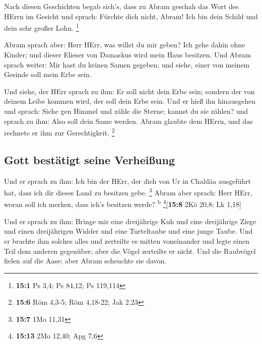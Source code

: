  Nach diesen Geschichten begab sich's, dass zu Abram
geschah das Wort des HErrn im Gesicht und sprach: Fürchte dich nicht,
Abram! Ich bin dein Schild und dein sehr großer Lohn. \footnote{\textbf{15:1}
  Ps 3,4; Ps 84,12; Ps 119,114}

 Abram sprach aber: Herr HErr, was willst du mir geben?
Ich gehe dahin ohne Kinder; und dieser Elieser von Damaskus wird mein
Haus besitzen.  Und Abram sprach weiter: Mir hast du
keinen Samen gegeben; und siehe, einer von meinem Gesinde soll mein Erbe
sein.

 Und siehe, der HErr sprach zu ihm: Er soll nicht dein
Erbe sein; sondern der von deinem Leibe kommen wird, der soll dein Erbe
sein.  Und er hieß ihn hinausgehen und sprach: Siehe gen
Himmel und zähle die Sterne; kannst du sie zählen? und sprach zu ihm:
Also soll dein Same werden.  Abram glaubte dem HErrn, und
das rechnete er ihm zur Gerechtigkeit. \footnote{\textbf{15:6} Röm
  4,3-5; Röm 4,18-22; Jak 2,23}

\hypertarget{gott-bestuxe4tigt-seine-verheiuxdfung}{%
\subsection{Gott bestätigt seine
Verheißung}\label{gott-bestuxe4tigt-seine-verheiuxdfung}}

 Und er sprach zu ihm: Ich bin der HErr, der dich von Ur
in Chaldäa ausgeführt hat, dass ich dir dieses Land zu besitzen gebe.
\footnote{\textbf{15:7} 1Mo 11,31}  Abram aber sprach:
Herr HErr, woran soll ich merken, dass ich's besitzen werde?
\textsuperscript{b} \footnote{\textbf{15:13} 2Mo 12,40; Apg 7,6}{[}\textbf{15:8}
2Kö 20,8; Lk 1,18{]}

 Und er sprach zu ihm: Bringe mir eine dreijährige Kuh und
eine dreijährige Ziege und einen dreijährigen Widder und eine
Turteltaube und eine junge Taube.  Und er brachte ihm
solches alles und zerteilte es mitten voneinander und legte einen Teil
dem anderen gegenüber; aber die Vögel zerteilte er nicht.
 Und die Raubvögel fielen auf die Aase; aber Abram
scheuchte sie davon.

